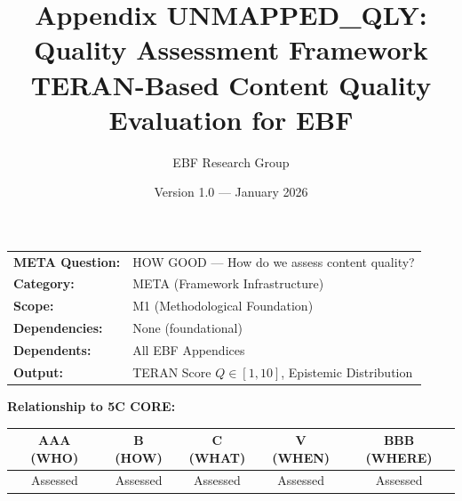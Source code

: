 \documentclass[11pt,a4paper]{article}
\title{\textbf{Appendix UNMAPPED_QLY: Quality Assessment Framework}\\
\large TERAN-Based Content Quality Evaluation for EBF}
\author{EBF Research Group}
\date{Version 1.0 — January 2026}
\begin{document}
\maketitle


\begin{tcolorbox}[colback=blue!5,colframe=blue!75!black,title=\textbf{Header Block}]
\begin{tabular}{p{4cm}p{10cm}}
\textbf{META Question:} & HOW GOOD — How do we assess content quality? \\
\textbf{Category:} & META (Framework Infrastructure) \\
\textbf{Scope:} & M1 (Methodological Foundation) \\
\textbf{Dependencies:} & None (foundational) \\
\textbf{Dependents:} & All EBF Appendices \\
\textbf{Output:} & TERAN Score $Q \in [1, 10]$, Epistemic Distribution \\
\end{tabular}

\vspace{0.3cm}
\textbf{Relationship to 5C CORE:}
\begin{center}
\begin{tabular}{|c|c|c|c|c|}
\hline
\textbf{AAA (WHO)} & \textbf{B (HOW)} & \textbf{C (WHAT)} & \textbf{V (WHEN)} & \textbf{BBB (WHERE)} \\
\hline
Assessed & Assessed & Assessed & Assessed & Assessed \\
\hline
\end{tabular}
\end{center}
\end{tcolorbox}

\end{document}
